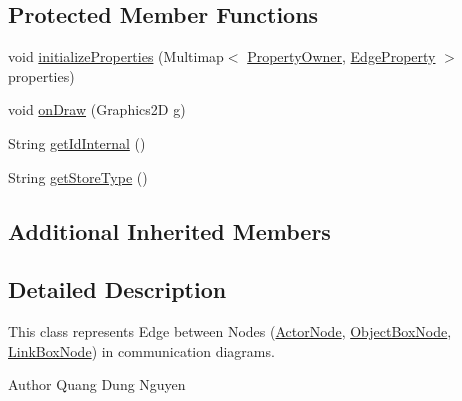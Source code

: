 \subsection*{Protected Member Functions}
\begin{DoxyCompactItemize}
\item 
void \hyperlink{classorg_1_1tzi_1_1use_1_1gui_1_1views_1_1diagrams_1_1behavior_1_1communicationdiagram_1_1_communication_diagram_edge_ae0f7bb4a7567ee1989aaf385189526a4}{initialize\-Properties} (Multimap$<$ \hyperlink{enumorg_1_1tzi_1_1use_1_1gui_1_1views_1_1diagrams_1_1elements_1_1edges_1_1_edge_base_1_1_property_owner}{Property\-Owner}, \hyperlink{classorg_1_1tzi_1_1use_1_1gui_1_1views_1_1diagrams_1_1elements_1_1_edge_property}{Edge\-Property} $>$ properties)
\item 
void \hyperlink{classorg_1_1tzi_1_1use_1_1gui_1_1views_1_1diagrams_1_1behavior_1_1communicationdiagram_1_1_communication_diagram_edge_ab7f07bda033280ce45c2e73ff69b6c13}{on\-Draw} (Graphics2\-D g)
\item 
String \hyperlink{classorg_1_1tzi_1_1use_1_1gui_1_1views_1_1diagrams_1_1behavior_1_1communicationdiagram_1_1_communication_diagram_edge_a28e045d84ed790e03fe7ed59a1639ab5}{get\-Id\-Internal} ()
\item 
String \hyperlink{classorg_1_1tzi_1_1use_1_1gui_1_1views_1_1diagrams_1_1behavior_1_1communicationdiagram_1_1_communication_diagram_edge_a975a10acc475126ad024b318ed3445f6}{get\-Store\-Type} ()
\end{DoxyCompactItemize}
\subsection*{Additional Inherited Members}


\subsection{Detailed Description}
This class represents Edge between Nodes (\hyperlink{classorg_1_1tzi_1_1use_1_1gui_1_1views_1_1diagrams_1_1behavior_1_1communicationdiagram_1_1_actor_node}{Actor\-Node}, \hyperlink{classorg_1_1tzi_1_1use_1_1gui_1_1views_1_1diagrams_1_1behavior_1_1communicationdiagram_1_1_object_box_node}{Object\-Box\-Node}, \hyperlink{classorg_1_1tzi_1_1use_1_1gui_1_1views_1_1diagrams_1_1behavior_1_1communicationdiagram_1_1_link_box_node}{Link\-Box\-Node}) in communication diagrams.

\begin{DoxyAuthor}{Author}
Quang Dung Nguyen 
\end{DoxyAuthor}


